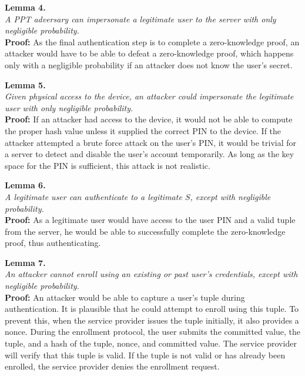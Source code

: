 \noindent \textbf{Lemma 4.} \\
\noindent \emph{A PPT adversary can impersonate a legitimate user to the server with only negligible probability.} \\
{\bf Proof:}   As the final authentication step is to complete a zero-knowledge proof, an attacker would have to be able
to defeat a zero-knowledge proof, which happens only with a negligible probability if an attacker does not know the
user's secret.%

\noindent \textbf{Lemma 5.} \\
\noindent \emph{Given physical access to the device, an attacker could impersonate the legitimate user with only
negligible probability.} \\
{\bf Proof:}  If an attacker had access to the device, it would not be able to compute the proper hash value unless it
supplied the correct PIN to the device. If the attacker attempted a brute force attack on the user's PIN,
it would be trivial for a server to detect and disable the user's account temporarily. As long as the key space for the
PIN is sufficient, this attack is not realistic.%

\noindent \textbf{Lemma 6.} \\
\noindent \emph{A legitimate user can authenticate to a legitimate $S$, except with negligible probability.} \\
{\bf Proof:}  As a legitimate user would have access to the user PIN and a valid tuple from the server, he would be
able to successfully complete the zero-knowledge proof, thus authenticating.%

\noindent \textbf{Lemma 7.} \\
\noindent \emph{An attacker cannot enroll using an existing or past user's credentials, except with negligible
probability.} \\
{\bf Proof:} An attacker would be able to capture a user's tuple during authentication. It is plausible that he could
attempt to enroll using this tuple. To prevent this, when the service provider issues the tuple initially, it also
provides a nonce. During the enrollment protocol, the user submits the committed value, the tuple, and a hash of the
tuple, nonce, and committed value. The service provider will verify that this tuple is valid. If the tuple is not
valid or has already been enrolled, the service provider denies the enrollment request.%

